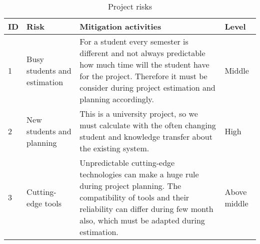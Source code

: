 \begin{table}[!h]
	\caption{Project risks}
	\label{table:Project-risks}
	\begin{center}
		\renewcommand{\arraystretch}{1.8}
		\begin{tabu} 
			to 0.9 \textwidth
			{ X[0.1, c] X[0.5, l] X[l] X[0.4, l] }
			\toprule
			ID & Risk                         & Mitigation activities                                                                                                                                                                                             & Level  \\   & Busy students and estimation & For a student every semester is different and not always predictable how much time will the student have for the project. Therefore it must be consider during project estimation and planning accordingly.       & Middle \\
			2  & New students and planning    & This is a university project, so we must calculate with the often changing student and knowledge transfer about the existing system.                                                                              & High   \\
			3  & Cutting-edge tools           & Unpredictable cutting-edge technologies can make a huge rule during project planning. The compatibility of tools and their reliability can differ during few month also, which must be adapted during estimation. & Above middle   \\ \bottomrule
		\end{tabu}
	\end{center}
\end{table}


